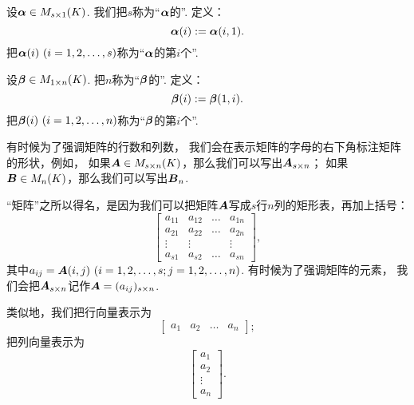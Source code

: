 设\(\boldsymbol\alpha\in M_{s \times 1}(K)\).
我们把\(s\)称为“\(\boldsymbol\alpha\)的”.
定义：\begin{equation*}
	\boldsymbol\alpha(i) := \boldsymbol\alpha(i,1).
\end{equation*}
把\(\vb\alpha(i)\ (i=1,2,\dotsc,s)\)称为“\(\boldsymbol\alpha\)的第\(i\)个”.

设\(\boldsymbol\beta\in M_{1 \times n}(K)\).
把\(n\)称为“\(\boldsymbol\beta\)的”.
定义：\begin{equation*}
	\boldsymbol\beta(i) := \boldsymbol\beta(1,i).
\end{equation*}
把\(\vb\beta(i)\ (i=1,2,\dotsc,n)\)称为“\(\boldsymbol\beta\)的第\(i\)个”.

有时候为了强调矩阵的行数和列数，
我们会在表示矩阵的字母的右下角标注矩阵的形状，例如，
如果\(\boldsymbol{A}\in M_{s \times n}(K)\)，那么我们可以写出\(\boldsymbol{A}_{s \times n}\)；
如果\(\boldsymbol{B}\in M_n(K)\)，那么我们可以写出\(\boldsymbol{B}_n\).

“矩阵”之所以得名，是因为我们可以把矩阵\(\boldsymbol{A}\)写成\(s\)行\(n\)列的矩形表，再加上括号：\begin{equation*}
	\begin{bmatrix}
		a_{11} & a_{12} & \dots & a_{1n} \\
		a_{21} & a_{22} & \dots & a_{2n} \\
		\vdots & \vdots & & \vdots \\
		a_{s1} & a_{s2} & \dots & a_{sn}
	\end{bmatrix},
\end{equation*}
其中\(a_{ij}=\vb{A}(i,j)\ (i=1,2,\dotsc,s;j=1,2,\dotsc,n)\).
有时候为了强调矩阵的元素，
我们会把\(\boldsymbol{A}_{s \times n}\)记作\(\boldsymbol{A}=(a_{ij})_{s \times n}\).

类似地，我们把行向量表示为\begin{equation*}
	\begin{bmatrix}
		a_1 & a_2 & \dots & a_n
	\end{bmatrix};
\end{equation*}
把列向量表示为\begin{equation*}
	\begin{bmatrix}
		a_1 \\ a_2 \\ \vdots \\ a_n
	\end{bmatrix}.
\end{equation*}

